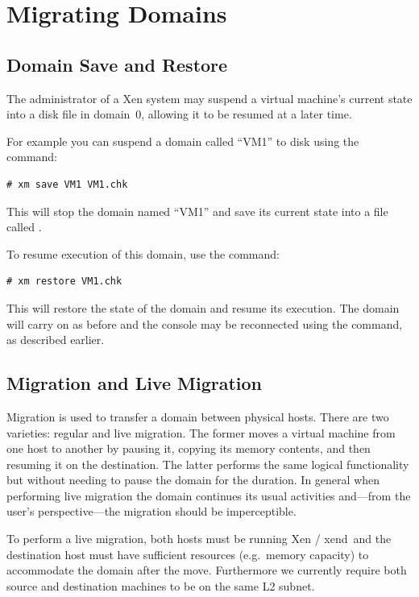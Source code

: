 \documentclass[11pt,twoside,final,openright]{report}
\def\xend{{xend}\xspace}
\begin{document}
\chapter{Migrating Domains}

\section{Domain Save and Restore}

The administrator of a Xen system may suspend a virtual machine's
current state into a disk file in domain~0, allowing it to be resumed at
a later time.

For example you can suspend a domain called ``VM1'' to disk using the
command:
\begin{verbatim}
# xm save VM1 VM1.chk
\end{verbatim}

This will stop the domain named ``VM1'' and save its current state
into a file called .

To resume execution of this domain, use the  command:
\begin{verbatim}
# xm restore VM1.chk
\end{verbatim}

This will restore the state of the domain and resume its execution.
The domain will carry on as before and the console may be reconnected
using the  command, as described earlier.

\section{Migration and Live Migration}

Migration is used to transfer a domain between physical hosts. There
are two varieties: regular and live migration. The former moves a
virtual machine from one host to another by pausing it, copying its
memory contents, and then resuming it on the destination. The latter
performs the same logical functionality but without needing to pause
the domain for the duration. In general when performing live migration
the domain continues its usual activities and---from the user's
perspective---the migration should be imperceptible.

To perform a live migration, both hosts must be running Xen / \xend\ and
the destination host must have sufficient resources (e.g.\ memory
capacity) to accommodate the domain after the move. Furthermore we
currently require both source and destination machines to be on the same
L2 subnet.
\end{document}
